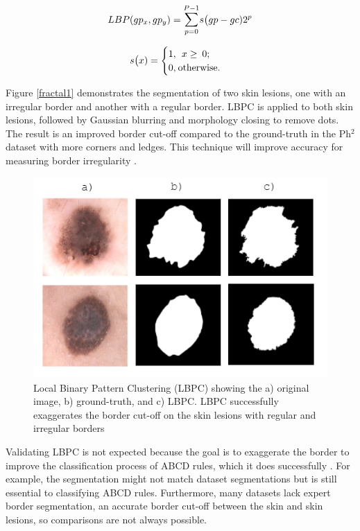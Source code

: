 \begin{equation} \label{eq1}
LBP(gp_x, gp_y) = \mathlarger{\sum}_{p=0}^{P-1}s\big(gp - gc)2^p
\end{equation}

\begin{equation} \label{eq2}
s\big(x) = 
\begin{cases}
1,\:\:x\geq\:0; \\
0,\:$otherwise$.
\end{cases}
\end{equation}

Figure \ref{fractal1} demonstrates the segmentation of two skin lesions, one with an irregular border and another with a regular border. LBPC is applied to both skin lesions, followed by Gaussian blurring and morphology closing to remove dots. The result is an improved border cut-off compared to the ground-truth in the Ph$^2$ dataset with more corners and ledges. This technique will improve accuracy for measuring border irregularity \cite{Pereira2020}.

\begin{figure}
\centering
\includegraphics[scale=1.2]{images/borders.PNG}
\caption{Local Binary Pattern Clustering (LBPC) showing the a) original image, b) ground-truth, and c) LBPC. LBPC successfully exaggerates the border cut-off on the skin lesions with regular and irregular borders} 
\end{figure} \label{fractal1}

Validating LBPC is not expected because the goal is to exaggerate the border to improve the classification process of ABCD rules, which it does successfully \cite{Pereira2020, Kaya2016}. For example, the segmentation might not match dataset segmentations but is still essential to classifying ABCD rules. Furthermore, many datasets lack expert border segmentation, an accurate border cut-off between the skin and skin lesions, so comparisons are not always possible.

